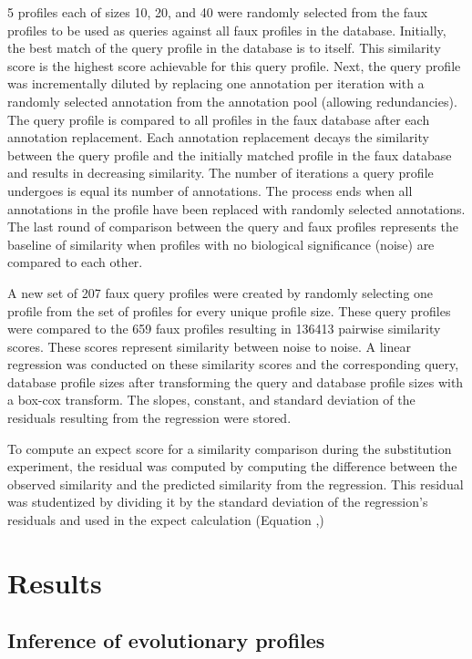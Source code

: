 \documentclass{article}
\begin{document}
5 profiles each of sizes 10, 20, and 40 were randomly selected from the faux profiles to be used as queries against all faux profiles in the database. Initially, the best match of the query profile in the database is to itself. This similarity score is the highest score achievable for this query profile. Next, the query profile was incrementally diluted by replacing one annotation per iteration with a randomly selected annotation from the annotation pool (allowing redundancies). The query profile is compared to all profiles in the faux database after each annotation replacement. Each annotation replacement decays the similarity between the query profile and the initially matched profile in the faux database and results in decreasing similarity. The number of iterations a query profile undergoes is equal its number of annotations. The process ends when all annotations in the profile have been replaced with randomly selected annotations. The last round of comparison between the query and faux profiles represents the baseline of similarity when profiles with no biological significance (noise) are compared to each other.

A new set of 207 faux query profiles were created by randomly selecting one profile from the set of profiles for every unique profile size. These query profiles were compared to the 659 faux profiles resulting in 136413 pairwise similarity scores. These scores represent similarity between noise to noise. A linear regression was conducted on these similarity scores and the corresponding query, database profile sizes after transforming the query and database profile sizes with a box-cox transform. The slopes, constant, and standard deviation of the residuals resulting from the regression were stored. 

To compute an expect score for a similarity comparison during the substitution experiment, the residual was computed by computing the difference between the observed similarity and the predicted similarity from the regression. This residual was studentized by dividing it by the standard deviation of the regression's residuals and used in the expect calculation (Equation \label{pvalue},\label{expect})

\section{Results}
\subsection{Inference of evolutionary profiles}
\end{document}
